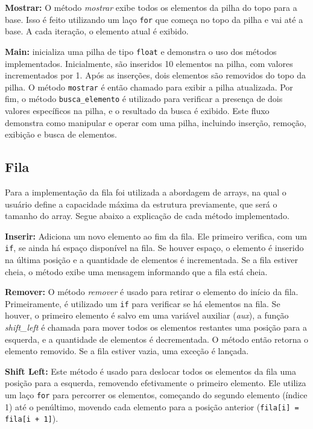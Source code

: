 \documentclass[12pt]{article}
\begin{document}
\textbf{Mostrar:} O método \textit{mostrar} exibe todos os elementos da pilha do topo para a base. Isso é feito utilizando um laço \texttt{for} que começa no topo da pilha e vai até a base. A cada iteração, o elemento atual é exibido.

\textbf{Main:} inicializa uma pilha de tipo \texttt{float} e demonstra o uso dos métodos implementados. Inicialmente, são inseridos 10 elementos na pilha, com valores incrementados por 1. Após as inserções, dois elementos são removidos do topo da pilha. O método \texttt{mostrar} é então chamado para exibir a pilha atualizada. Por fim, o método \texttt{busca\_elemento} é utilizado para verificar a presença de dois valores específicos na pilha, e o resultado da busca é exibido. Este fluxo demonstra como manipular e operar com uma pilha, incluindo inserção, remoção, exibição e busca de elementos.

\subsection{Fila}
Para a implementação da fila foi utilizada a abordagem de arrays, na qual o usuário define a capacidade máxima da estrutura previamente, que será o tamanho do array. Segue abaixo a explicação de cada método implementado.

\textbf{Inserir:} Adiciona um novo elemento ao fim da fila. Ele primeiro verifica, com um \texttt{if}, se ainda há espaço disponível na fila. Se houver espaço, o elemento é inserido na última posição e a quantidade de elementos é incrementada. Se a fila estiver cheia, o método exibe uma mensagem informando que a fila está cheia.

\textbf{Remover:} O método \textit{remover} é usado para retirar o elemento do início da fila. Primeiramente, é utilizado um \texttt{if} para verificar se há elementos na fila. Se houver, o primeiro elemento é salvo em uma variável auxiliar (\textit{aux}), a função \textit{shift\_left} é chamada para mover todos os elementos restantes uma posição para a esquerda, e a quantidade de elementos é decrementada. O método então retorna o elemento removido. Se a fila estiver vazia, uma exceção é lançada.

\textbf{Shift Left:} Este método é usado para deslocar todos os elementos da fila uma posição para a esquerda, removendo efetivamente o primeiro elemento. Ele utiliza um laço \texttt{for} para percorrer os elementos, começando do segundo elemento (índice 1) até o penúltimo, movendo cada elemento para a posição anterior (\texttt{fila[i] = fila[i + 1]}).
\end{document}
